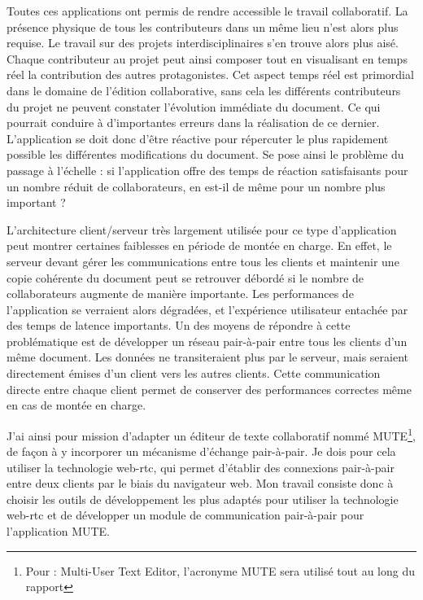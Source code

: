 \documentclass{tnreport}
\begin{document}
Toutes ces applications ont permis de rendre accessible le travail collaboratif. La présence physique de tous les contributeurs dans 
un même lieu n'est alors plus requise. Le travail sur des projets interdisciplinaires s'en trouve alors plus aisé. Chaque contributeur 
au projet peut ainsi composer tout en visualisant en temps réel la contribution des autres protagonistes. Cet aspect temps réel est 
primordial dans le domaine de l'édition collaborative, sans cela les différents contributeurs du projet ne peuvent constater 
l'évolution immédiate du document. Ce qui pourrait conduire à d'importantes erreurs dans la réalisation de ce dernier. L'application se doit donc d'être réactive pour répercuter le plus rapidement possible les différentes modifications du document. Se pose ainsi le 
problème du passage à l'échelle : si l'application offre des temps de réaction satisfaisants pour un nombre réduit de collaborateurs, 
en est-il de même pour un nombre plus important ? 

L'architecture client/serveur très largement utilisée pour ce type d'application peut montrer certaines faiblesses en période de 
montée en charge. En effet, le serveur devant gérer les communications entre tous les clients et maintenir une copie cohérente du 
document peut se retrouver débordé si le nombre de collaborateurs augmente de manière importante. Les performances de l'application se 
verraient alors dégradées, et l'expérience utilisateur entachée par des temps de latence importants. Un des moyens de répondre à cette 
problématique est de développer un réseau pair-à-pair entre tous les clients d'un même document. Les données ne transiteraient plus 
par le serveur, mais seraient directement émises d'un client vers les autres clients. Cette communication directe entre chaque client 
permet de conserver des performances correctes même en cas de montée en charge. 

J'ai ainsi pour mission d'adapter un éditeur de texte collaboratif nommé MUTE\footnote{Pour : Multi-User Text Editor, l'acronyme MUTE sera utilisé tout au long du rapport}, de façon à y incorporer un mécanisme d'échange pair-à-pair. Je dois pour cela utiliser la technologie web-rtc, qui permet d'établir des connexions pair-à-pair entre deux clients par le biais du navigateur web. Mon travail consiste donc à choisir les outils de développement les 
plus adaptés pour utiliser la technologie web-rtc et de développer un module de communication pair-à-pair pour l'application MUTE. 


\cleardoublepage
\end{document}
